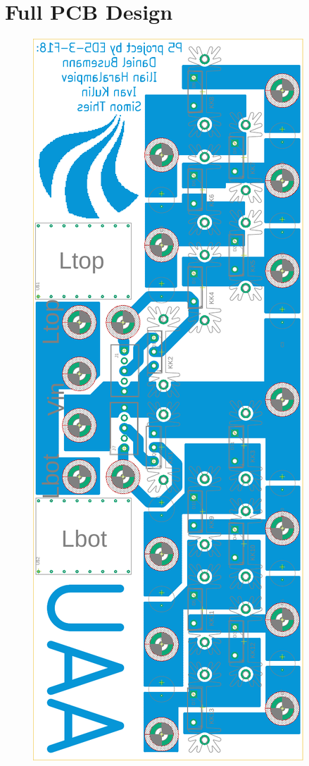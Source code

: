 \chapter{Full PCB Design}
\label{app:LTSpice}
\vspace{-15mm}
\begin{figure}[H]
	\centering
	\includegraphics[height = 0.8\textheight, keepaspectratio]{figures/05cPCBDesign/FULL_3level_2NX_interleaved_boost_converter.pdf}
\end{figure}